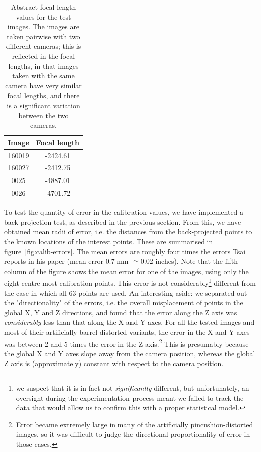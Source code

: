 \begin{table}[h]
  \centering
  \begin{tabular}{c c}
    \toprule
    \textbf{Image} & \textbf{Focal length}\\
    \midrule
    160019 & -2424.61\\
    160027 & -2412.75\\
    0025 & -4887.01\\
    0026 & -4701.72\\
    \bottomrule
  \end{tabular}
  \caption[Focal length values for the test images]{Abstract focal length
    values for the test images. The images are taken pairwise with two
    different cameras; this is reflected in the focal lengths,
    in that images taken with the same camera have very similar focal
    lengths, and there is a significant variation between the two cameras.}
  \label{tbl:focal-lengths}
\end{table}

To test the quantity of error in the calibration values, we have
implemented a back-projection test, as described in the previous
section. From this, we have obtained mean radii of error, i.e. the
distances from the back-projected points to the known locations of the
interest points. These are summarised in
figure~\ref{fig:calib-errors}. The mean errors are roughly four times
the errors Tsai reports in his paper (mean error $0.7$ mm $\simeq0.02$
inches). Note that the fifth column of the figure shows the mean error for one
of the images, using only the eight centre-most calibration points.
This error is not considerably\footnote{ we suspect that it is in fact not \emph{significantly} different, but unfortunately, an oversight during the experimentation process meant we failed to track the data that would allow us to confirm this with a proper statistical model.} different from the case in which all 63 points are used. An interesting aside: we separated out the "directionality" of the errors, i.e. the overall misplacement of points in the global X, Y and Z directions, and found that the error along the Z axis was \emph{considerably} less than that along the X and Y axes. For all the tested images and most of their artificially barrel-distorted variants, the error in the X and Y axes was between 2 and 5 times the error in the Z axis.\footnote{ Error became extremely large in many of the artificially pincushion-distorted images, so it was difficult to judge the directional proportionality of error in those cases.} This is presumably because the global X and Y axes slope away from the camera position, whereas the global Z axis is (approximately) constant with respect to the camera position.

